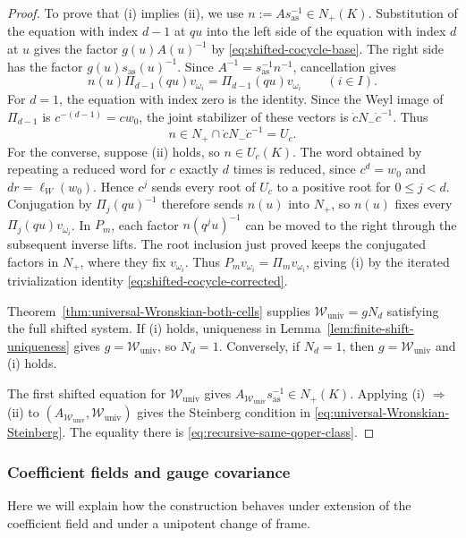 \documentclass[11pt,leqno]{amsart}
\numberwithin{equation}{section}
\theoremstyle{plain}
\theoremstyle{definition}
\theoremstyle{plain}
\theoremstyle{definition}
\theoremstyle{remark}
\begin{document}
\begin{proof}
To prove that (i) implies (ii), we use $n:=As_{\mathrm{as}}^{-1}\in N_+(K)$.  Substitution of the equation with index $d-1$ at $qu$ into the left side of the equation with index $d$ at $u$ gives the factor $g(u)A(u)^{-1}$ by \eqref{eq:shifted-cocycle-base}.  The right side has the factor $g(u)s_{\mathrm{as}}(u)^{-1}$.  Since $A^{-1}=s_{\mathrm{as}}^{-1}n^{-1}$, cancellation gives
\[
 n(u)\Pi_{d-1}(qu)v_{\omega_i}
 =\Pi_{d-1}(qu)v_{\omega_i}
 \qquad(i\in I).
\]
For $d=1$, the equation with index zero is the identity. Since the Weyl image of $\Pi_{d-1}$ is $c^{-(d-1)}=cw_0$, the joint stabilizer of these vectors is $\dot cN_-\dot c^{-1}$. Thus
\[
 n\in N_+\cap\dot cN_-\dot c^{-1}=U_c.
\]
For the converse, suppose (ii) holds, so $n\in U_c(K)$. The word obtained by repeating a reduced word for $c$ exactly $d$ times is reduced, since $c^d=w_0$ and $dr=\ell_W(w_0)$. Hence $c^j$ sends every root of $U_c$ to a positive root for $0\le j<d$. Conjugation by $\Pi_j(qu)^{-1}$ therefore sends $n(u)$ into $N_+$, so $n(u)$ fixes every $\Pi_j(qu)v_{\omega_i}$. In $P_m$, each factor $n(q^ju)^{-1}$ can be moved to the right through the subsequent inverse lifts.  The root inclusion just proved keeps the conjugated factors in $N_+$, where they fix $v_{\omega_i}$.  Thus $P_mv_{\omega_i}=\Pi_mv_{\omega_i}$, giving (i) by the iterated trivialization identity \eqref{eq:shifted-cocycle-corrected}.

Theorem~\ref{thm:universal-Wronskian-both-cells} supplies $\mathscr W_{\mathrm{univ}}=gN_d$ satisfying the full shifted system. If (i) holds, uniqueness in Lemma~\ref{lem:finite-shift-uniqueness} gives $g=\mathscr W_{\mathrm{univ}}$, so $N_d=1$. Conversely, if $N_d=1$, then $g=\mathscr W_{\mathrm{univ}}$ and (i) holds.

The first shifted equation for $\mathscr W_{\mathrm{univ}}$ gives $A_{\mathscr W_{\mathrm{univ}}}s_{\mathrm{as}}^{-1}\in N_+(K)$. Applying (i) $\Rightarrow$ (ii) to $(A_{\mathscr W_{\mathrm{univ}}},\mathscr W_{\mathrm{univ}})$ gives the Steinberg condition in \eqref{eq:universal-Wronskian-Steinberg}. The equality there is \eqref{eq:recursive-same-qoper-class}.
\end{proof}

\subsubsection{Coefficient fields and gauge covariance}
Here we will explain how the construction behaves under extension of the coefficient field and under a unipotent change of frame.
\end{document}
